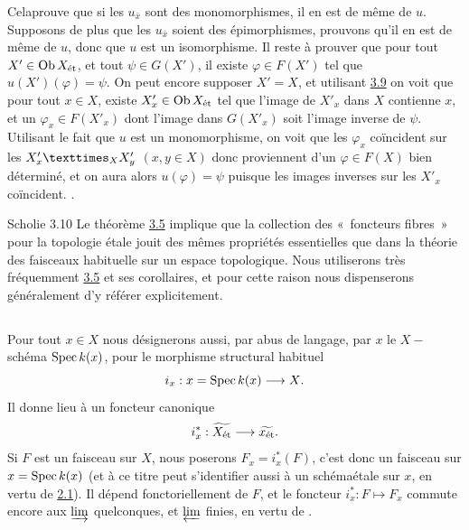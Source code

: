 \documentclass[10pt]{../fichiers-configuration-latex/smfart}
\begin{document}
Cela\pageoriginale prouve que si les $u_{\bar{x}}$ sont des
monomorphismes, il en
est de même de $u$. Supposons de plus que les $u_{\bar{x}}$ soient des
épimorphismes, prouvons qu'il en est de même de $u$, donc que $u$ est
un isomorphisme. Il reste à prouver que pour tout $X'\in \operatorname{Ob} X_{\text{ét}}$,
et tout $\psi \in G (X')$, il existe $\varphi \in F(X')$ tel que
$u(X') (\varphi) = \psi$. On peut encore supposer $X'= X$, et
utilisant \hyperref[VIII.prop3.9]{3.9} %
on voit que pour tout $x \in X$,  existe $X'_x \in \operatorname{Ob}
X_{\text{ét}}$ tel que l'image de $X'_x$ dans $X$ contienne $x$, et un
$\varphi_x \in F(X'_x)$ dont l'image dans $G (X'_x)$ soit
l'image inverse de $\psi$. Utilisant le fait que $u$ est un
monomorphisme, on voit que les $\varphi_{x}$ coïncident sur les
$\fprod{X'_x}{X'_y}{X}$ $(x, y \in X)$  donc proviennent d'un
$\varphi \in F (X)$ bien déterminé, et on aura alors $u(\varphi) =
\psi$ puisque les images inverses sur les $X'_{x}$
coïncident. \cqfd.

\begin{enonce*}[remark]{Scholie 3.10}
Le théorème \hyperref[VIII.thm3.5]{3.5} implique que la collection des
« foncteurs fibres »
pour la topologie étale jouit des mêmes propriétés essentielles que
dans la théorie des faisceaux habituelle sur un espace
topologique. Nous utiliserons très fréquemment \hyperref[VIII.thm3.5]{3.5}
et ses corollaires,
et pour cette raison nous  dispenserons généralement d'y référer explicitement.
\end{enonce*}

\setcounter{subsection}{10}
\subsection{}

Pour tout $x \in X$ nous désignerons aussi, par abus de langage, par
$x$ le $X-$ schéma $\operatorname{Spec} k(x)$, pour le morphisme structural habituel
$$
i_x : x = \Spec k(x) \to X{\quoi}.
$$
Il donne lieu à un foncteur canonique
$$
i_x^{\ast} : \widetilde{X_{\text{ét}}} \to \widetilde{x_{\text{ét}}}{\quoi}.
$$
Si $F$ est un faisceau sur $X$, nous poserons $F_x = i^{\ast}_x
(F)$, c'est donc un faisceau sur $x = \operatorname{Spec} k(x)$ (et à ce titre
peut s'identifier aussi à un schéma\pageoriginale étale sur $x$, en
vertu de \hyperref[VIII.prop2.1]{2.1}). Il dépend fonctoriellement de $F$, et
le foncteur $i^{\ast}_x : F \mapsto F_x$ commute encore aux
$\varinjlim$ quelconques, et $\varprojlim$ finies, en vertu de
.
\end{document}

